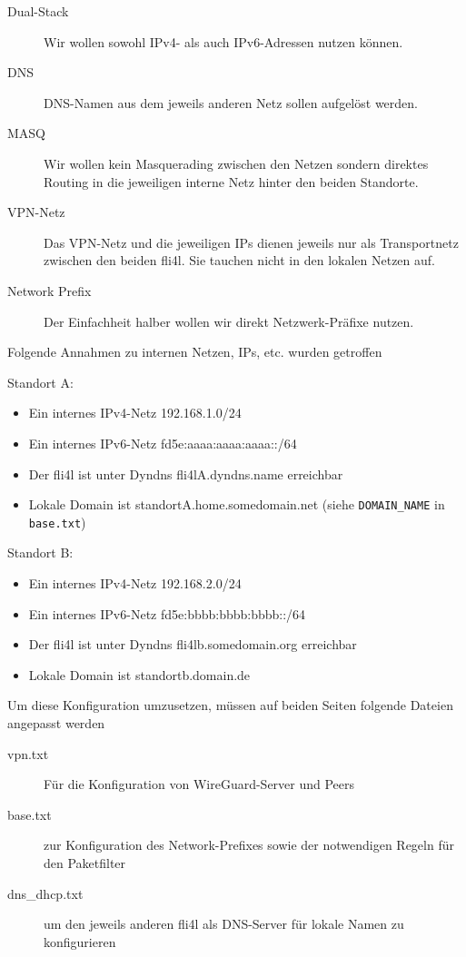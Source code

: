 \begin{description}
    \item[Dual-Stack] Wir wollen sowohl IPv4- als auch IPv6-Adressen nutzen können.
    \item[DNS] DNS-Namen aus dem jeweils anderen Netz sollen aufgelöst werden.
    \item[MASQ] Wir wollen kein Masquerading zwischen den Netzen sondern direktes Routing in die 
    jeweiligen interne Netz hinter den beiden Standorte.
    \item[VPN-Netz] Das VPN-Netz und die jeweiligen IPs dienen jeweils nur als Transportnetz zwischen 
                    den beiden fli4l. Sie tauchen nicht in den lokalen Netzen auf.
    \item[Network Prefix] Der Einfachheit halber wollen wir direkt Netzwerk-Präfixe nutzen.
\end{description}

Folgende Annahmen zu internen Netzen, IPs, etc. wurden getroffen

Standort A:
\begin{itemize}
    \item Ein internes IPv4-Netz 192.168.1.0/24
    \item Ein internes IPv6-Netz fd5e:aaaa:aaaa:aaaa::/64
    \item Der fli4l ist unter Dyndns fli4lA.dyndns.name erreichbar
    \item Lokale Domain ist standortA.home.somedomain.net (siehe \verb+DOMAIN_NAME+ in \verb+base.txt+)
\end{itemize}


Standort B:
\begin{itemize}
    \item Ein internes IPv4-Netz 192.168.2.0/24
    \item Ein internes IPv6-Netz fd5e:bbbb:bbbb:bbbb::/64
    \item Der fli4l ist unter Dyndns fli4lb.somedomain.org erreichbar
    \item Lokale Domain ist standortb.domain.de
\end{itemize}


Um diese Konfiguration umzusetzen, müssen auf beiden Seiten folgende Dateien angepasst werden

\begin{description}
    \item[vpn.txt] Für die Konfiguration von WireGuard-Server und Peers
    \item[base.txt] zur Konfiguration des Network-Prefixes sowie der notwendigen Regeln für 
    den Paketfilter
    \item[dns\_dhcp.txt] um den jeweils anderen fli4l als DNS-Server für lokale Namen 
    zu konfigurieren
\end{description}


